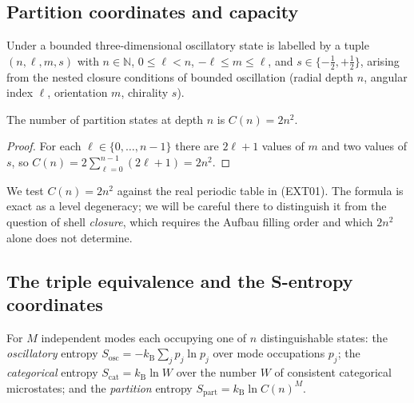 \documentclass[11pt,twocolumn,a4paper]{article}
\newcommand{\N}{\mathbb{N}}
\newcommand{\kB}{k_{\mathrm{B}}}
\begin{document}
\subsection{Partition coordinates and capacity}

\begin{definition}\label{def:partition-coords}
Under  a bounded three-dimensional
oscillatory state is labelled by a tuple $(n,\ell,m,s)$ with $n\in\N$,
$0\le\ell<n$, $-\ell\le m\le\ell$, and $s\in\{-\tfrac12,+\tfrac12\}$, arising
from the nested closure conditions of bounded oscillation (radial depth $n$,
angular index $\ell$, orientation $m$, chirality $s$).
\end{definition}

\begin{theorem}\label{thm:capacity}
The number of partition states at depth $n$ is $C(n)=2n^2$.
\end{theorem}

\begin{proof}
For each $\ell\in\{0,\dots,n-1\}$ there are $2\ell+1$ values of $m$ and two
values of $s$, so $C(n)=2\sum_{\ell=0}^{n-1}(2\ell+1)=2n^2$.
\end{proof}

\begin{remark}
We test $C(n)=2n^2$ against the real periodic table in 
(EXT01). The formula is exact as a level degeneracy; we will be careful there
to distinguish it from the question of shell \emph{closure}, which requires the
Aufbau filling order and which $2n^2$ alone does not determine.
\end{remark}

\subsection{The triple equivalence and the S-entropy coordinates}

\begin{definition}\label{def:three-entropies}
For $M$ independent modes each occupying one of $n$ distinguishable states:
the \emph{oscillatory} entropy $S_{\mathrm{osc}}=-\kB\sum_j p_j\ln p_j$ over
mode occupations $p_j$; the \emph{categorical} entropy $S_{\mathrm{cat}}=
\kB\ln W$ over the number $W$ of consistent categorical microstates; and the
\emph{partition} entropy $S_{\mathrm{part}}=\kB\ln C(n)^M$.
\end{definition}
\end{document}
